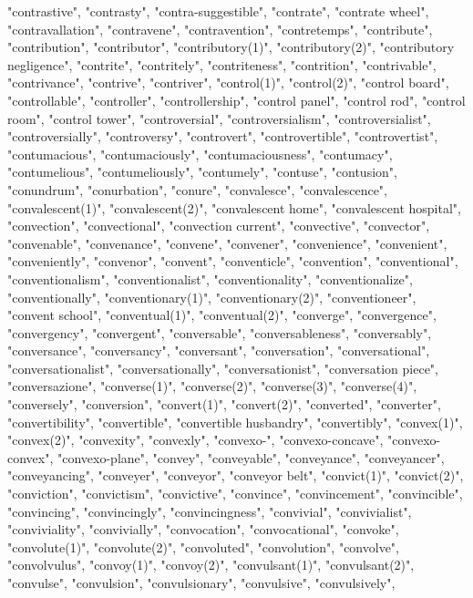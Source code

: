"contrastive",
"contrasty",
"contra-suggestible",
"contrate",
"contrate wheel",
"contravallation",
"contravene",
"contravention",
"contretemps",
"contribute",
"contribution",
"contributor",
"contributory(1)",
"contributory(2)",
"contributory negligence",
"contrite",
"contritely",
"contriteness",
"contrition",
"contrivable",
"contrivance",
"contrive",
"contriver",
"control(1)",
"control(2)",
"control board",
"controllable",
"controller",
"controllership",
"control panel",
"control rod",
"control room",
"control tower",
"controversial",
"controversialism",
"controversialist",
"controversially",
"controversy",
"controvert",
"controvertible",
"controvertist",
"contumacious",
"contumaciously",
"contumaciousness",
"contumacy",
"contumelious",
"contumeliously",
"contumely",
"contuse",
"contusion",
"conundrum",
"conurbation",
"conure",
"convalesce",
"convalescence",
"convalescent(1)",
"convalescent(2)",
"convalescent home",
"convalescent hospital",
"convection",
"convectional",
"convection current",
"convective",
"convector",
"convenable",
"convenance",
"convene",
"convener",
"convenience",
"convenient",
"conveniently",
"convenor",
"convent",
"conventicle",
"convention",
"conventional",
"conventionalism",
"conventionalist",
"conventionality",
"conventionalize",
"conventionally",
"conventionary(1)",
"conventionary(2)",
"conventioneer",
"convent school",
"conventual(1)",
"conventual(2)",
"converge",
"convergence",
"convergency",
"convergent",
"conversable",
"conversableness",
"conversably",
"conversance",
"conversancy",
"conversant",
"conversation",
"conversational",
"conversationalist",
"conversationally",
"conversationist",
"conversation piece",
"conversazione",
"converse(1)",
"converse(2)",
"converse(3)",
"converse(4)",
"conversely",
"conversion",
"convert(1)",
"convert(2)",
"converted",
"converter",
"convertibility",
"convertible",
"convertible husbandry",
"convertibly",
"convex(1)",
"convex(2)",
"convexity",
"convexly",
"convexo-",
"convexo-concave",
"convexo-convex",
"convexo-plane",
"convey",
"conveyable",
"conveyance",
"conveyancer",
"conveyancing",
"conveyer",
"conveyor",
"conveyor belt",
"convict(1)",
"convict(2)",
"conviction",
"convictism",
"convictive",
"convince",
"convincement",
"convincible",
"convincing",
"convincingly",
"convincingness",
"convivial",
"convivialist",
"conviviality",
"convivially",
"convocation",
"convocational",
"convoke",
"convolute(1)",
"convolute(2)",
"convoluted",
"convolution",
"convolve",
"convolvulus",
"convoy(1)",
"convoy(2)",
"convulsant(1)",
"convulsant(2)",
"convulse",
"convulsion",
"convulsionary",
"convulsive",
"convulsively",
